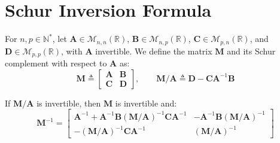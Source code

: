 \section{Schur Inversion Formula}

\begin{proposition}\label{th:Schur}
	For $n,p\in\mathbb{N}^*$, let $\mathbf{A}\in\mathcal{M}_{n,n}(\mathbb{R})$, $\mathbf{B}\in\mathcal{M}_{n,p}(\mathbb{R})$, $\mathbf{C}\in\mathcal{M}_{p,n}(\mathbb{R})$, and $\mathbf{D}\in\mathcal{M}_{p,p}(\mathbb{R})$, with $\mathbf{A}$ invertible. We define the matrix $\mathbf{M}$ and its Schur complement with respect to $\mathbf{A}$ as:
	\begin{equation}
		\mathbf{M}\triangleq\begin{bmatrix}\mathbf{A}&\mathbf{B}\\\mathbf{C}&\mathbf{D}\end{bmatrix},\qquad \mathbf{M}/\mathbf{A}\triangleq \mathbf{D}-\mathbf{C}\mathbf{A}^{-1}\mathbf{B}
	\end{equation}

	If $\mathbf{M}/\mathbf{A}$ is invertible, then $\mathbf{M}$ is invertible and:
	\begin{equation}
		\mathbf{M}^{-1}=\begin{bmatrix}\mathbf{A}^{-1}+\mathbf{A}^{-1}\mathbf{B}(\mathbf{M}/\mathbf{A})^{-1}\mathbf{C}\mathbf{A}^{-1}&-\mathbf{A}^{-1}\mathbf{B}(\mathbf{M}/\mathbf{A})^{-1}\\-(\mathbf{M}/\mathbf{A})^{-1}\mathbf{C}\mathbf{A}^{-1}&(\mathbf{M}/\mathbf{A})^{-1}\end{bmatrix}
	\end{equation}
\end{proposition}

